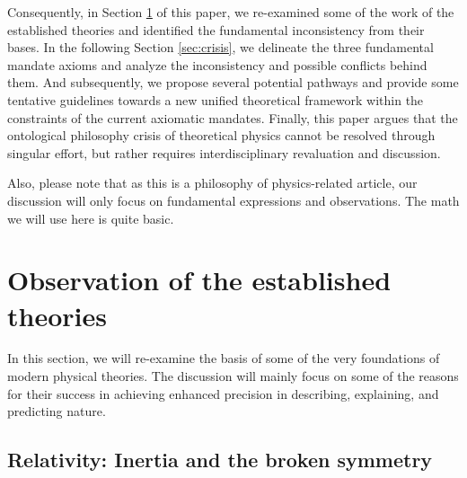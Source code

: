 \documentclass{article}
\begin{document}
Consequently, in Section \hyperref[sec:established]{\ref{sec:established}} of this paper, we re-examined some of the work of the established theories and identified the fundamental inconsistency from their bases. In the following Section \hyperref[sec:crisis]{\ref{sec:crisis}}, we delineate the three fundamental mandate axioms and analyze the inconsistency and possible conflicts behind them. And subsequently, we propose several potential pathways and provide some tentative guidelines towards a new unified theoretical framework within the constraints of the current axiomatic mandates. Finally, this paper argues that the ontological philosophy crisis of theoretical physics cannot be resolved through singular effort, but rather requires interdisciplinary revaluation and discussion.

Also, please note that as this is a philosophy of physics-related article, our discussion will only focus on fundamental expressions and observations. The math we will use here is quite basic.

\section{Observation of the established theories}
\label{sec:established}

In this section, we will re-examine the basis of some of the very foundations of modern physical theories. The discussion will mainly focus on some of the reasons for their success in achieving enhanced precision in describing, explaining, and predicting nature.

\subsection{Relativity: Inertia and the broken symmetry}
\end{document}
